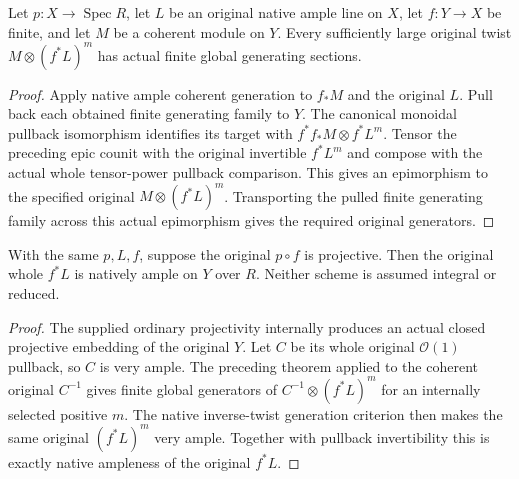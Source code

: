 \begin{theorem}
\label{thm:pl-auxiliary-finite-pullback-eventual-generation}
\leanok
{}
Let $p:X\to\operatorname{Spec}R$, let $L$ be an original native
ample line on $X$, let $f:Y\to X$ be finite, and let $M$ be a
coherent module on $Y$. Every sufficiently large original twist
$M\otimes(f^*L)^m$ has actual finite global generating sections.
\end{theorem}
\begin{proof}
\leanok
Apply native ample coherent generation to $f_*M$ and the original
$L$. Pull back each obtained finite generating family to $Y$.
The canonical monoidal pullback isomorphism identifies its target
with $f^*f_*M\otimes f^*L^m$. Tensor the preceding epic counit
with the original invertible $f^*L^m$ and compose with the actual
whole tensor-power pullback comparison. This gives an epimorphism
to the specified original $M\otimes(f^*L)^m$. Transporting the
pulled finite generating family across this actual epimorphism
gives the required original generators.
\end{proof}

\begin{theorem}
\label{thm:pl-auxiliary-native-finite-pullback-ample}
\leanok
{}
With the same $p,L,f$, suppose the original $p\circ f$ is
projective. Then the original whole $f^*L$ is natively ample on
$Y$ over $R$. Neither scheme is assumed integral or reduced.
\end{theorem}
\begin{proof}
\leanok
The supplied ordinary projectivity internally produces an actual
closed projective embedding of the original $Y$. Let $C$ be its
whole original $\mathcal O(1)$ pullback, so $C$ is very ample.
The preceding theorem applied to the coherent original $C^{-1}$
gives finite global generators of $C^{-1}\otimes(f^*L)^m$ for
an internally selected positive $m$. The native inverse-twist
generation criterion then makes the same original $(f^*L)^m$
very ample. Together with pullback invertibility this is exactly
native ampleness of the original $f^*L$.
\end{proof}
